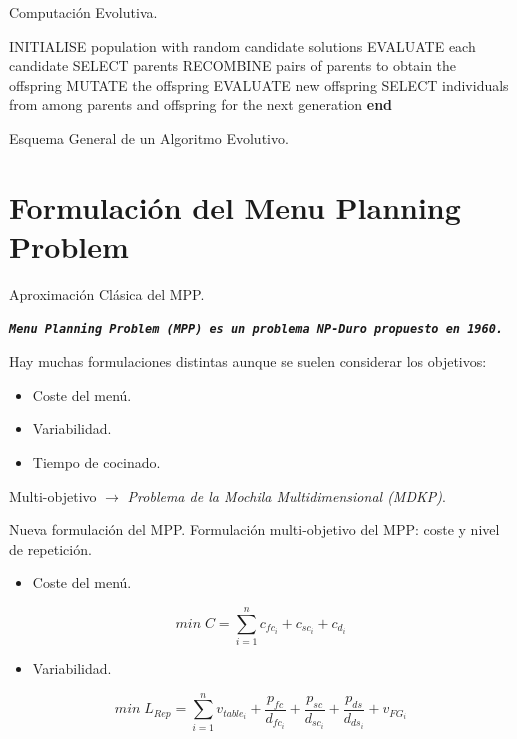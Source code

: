 \documentclass[12pt]{beamer}
\begin{document}
\begin{frame}[fragile]{Computación Evolutiva.}
 \begin{algorithm}[H]
\begin{algorithmic}[1]
  \State INITIALISE population with random candidate solutions
  \State EVALUATE each candidate
    \State SELECT parents
    \State RECOMBINE pairs of parents to obtain the offspring
    \State MUTATE the offspring
    \State EVALUATE new offspring
    \State SELECT individuals from among parents and offspring for the next generation 
  \EndWhile
  \State \textbf{end}
  \end{algorithmic}
    \caption{Esquema General de un Algoritmo Evolutivo.}
\end{algorithm}
\end{frame}

\section{Formulación del Menu Planning Problem}
\begin{frame}[fragile]{Aproximación Clásica del MPP.}
\begin{center}
        \texttt{\textbf{\textit{Menu Planning Problem~(MPP) es un problema NP-Duro propuesto en 1960\cite{Ngo2016}.}}}
    \end{center}
Hay muchas formulaciones distintas aunque se suelen considerar los objetivos:
    \begin{itemize}
        \item Coste del menú.
        \item Variabilidad.
        \item Tiempo de cocinado.
    \end{itemize}
Multi-objetivo $\rightarrow$ \textit{Problema de la Mochila Multidimensional (MDKP)}.
\end{frame}

\begin{frame}[fragile]{Nueva formulación del MPP.}
    Formulación multi-objetivo del MPP: coste y nivel de repetición.
    \begin{itemize}
        \item Coste del menú.
    \end{itemize}
\[
    min\; C = \sum_{i=1}^{n}{c_{fc_{i}} + c_{sc_{i}} + c_{d_{i}}}
\]
\begin{itemize}
    \item Variabilidad.
\end{itemize}
\[
    min\; L_{Rep} = \sum_{i=1}^{n}{v_{table_{i}} + \frac{p_{fc}}{d_{fc_{i}}} + \frac{p_{sc}}{d_{sc_{i}}} + \frac{p_{ds}}{d_{ds_{i}}} + v_{FG_{i}}}
\]
\end{frame}
\end{document}
